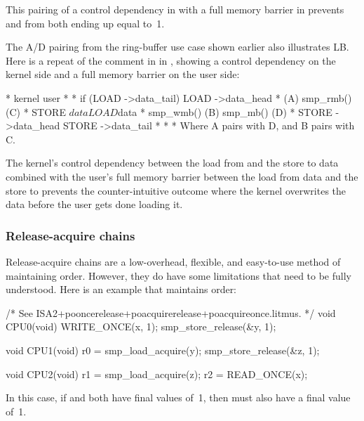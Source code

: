 This pairing of a control dependency in  with a full memory
barrier in  prevents  and  from both ending up
equal to~1.

The A/D pairing from the ring-buffer use case shown earlier also
illustrates LB.  Here is a repeat of the comment in
 in ,
showing a control dependency on the kernel side and a full memory barrier on
the user side:

\begin{VerbatimU}
	 *   kernel                             user
	 *
	 *   if (LOAD ->data_tail) {            LOAD ->data_head
	 *                      (A)             smp_rmb()       (C)
	 *      STORE $data                     LOAD $data
	 *      smp_wmb()       (B)             smp_mb()        (D)
	 *      STORE ->data_head               STORE ->data_tail
	 *   }
	 *
	 * Where A pairs with D, and B pairs with C.
\end{VerbatimU}

The kernel's control dependency between the load from 
and the store to data combined with the user's full memory barrier
between the load from data and the store to  prevents
the counter-intuitive outcome where the kernel overwrites the data
before the user gets done loading it.


\subsubsection{Release-acquire chains}

Release-acquire chains are a low-overhead, flexible, and easy-to-use
method of maintaining order.
However, they do have some limitations that need to be fully understood.
Here is an example that maintains order:

\begin{VerbatimU}
	/* See ISA2+pooncerelease+poacquirerelease+poacquireonce.litmus. */
	void CPU0(void)
	{
		WRITE_ONCE(x, 1);
		smp_store_release(&y, 1);
	}

	void CPU1(void)
	{
		r0 = smp_load_acquire(y);
		smp_store_release(&z, 1);
	}

	void CPU2(void)
	{
		r1 = smp_load_acquire(z);
		r2 = READ_ONCE(x);
	}
\end{VerbatimU}

In this case, if  and  both have final values of~1, then 
must also have a final value of~1.

